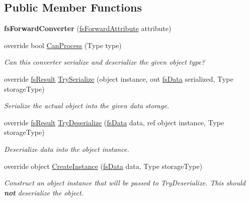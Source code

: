 \subsection*{Public Member Functions}
\begin{DoxyCompactItemize}
\item 
\mbox{\label{class_full_serializer_1_1_internal_1_1fs_forward_converter_a485561a31edc65a3f1c6972af8b677e3}} 
{\bfseries fs\+Forward\+Converter} (\hyperlink{class_full_serializer_1_1fs_forward_attribute}{fs\+Forward\+Attribute} attribute)
\item 
override bool \hyperlink{class_full_serializer_1_1_internal_1_1fs_forward_converter_a252f2f0a0391e2099be798b1749a2582}{Can\+Process} (Type type)
\begin{DoxyCompactList}\small\item\em Can this converter serialize and deserialize the given object type? \end{DoxyCompactList}\item 
override \hyperlink{struct_full_serializer_1_1fs_result}{fs\+Result} \hyperlink{class_full_serializer_1_1_internal_1_1fs_forward_converter_a71b51a115cf749f1a3232fb1498f2d6f}{Try\+Serialize} (object instance, out \hyperlink{class_full_serializer_1_1fs_data}{fs\+Data} serialized, Type storage\+Type)
\begin{DoxyCompactList}\small\item\em Serialize the actual object into the given data storage. \end{DoxyCompactList}\item 
override \hyperlink{struct_full_serializer_1_1fs_result}{fs\+Result} \hyperlink{class_full_serializer_1_1_internal_1_1fs_forward_converter_a81d2d460112d57d67e8156cd5a52e1e1}{Try\+Deserialize} (\hyperlink{class_full_serializer_1_1fs_data}{fs\+Data} data, ref object instance, Type storage\+Type)
\begin{DoxyCompactList}\small\item\em Deserialize data into the object instance. \end{DoxyCompactList}\item 
override object \hyperlink{class_full_serializer_1_1_internal_1_1fs_forward_converter_ac060a50ae6f3241ea0f9465e1d261d12}{Create\+Instance} (\hyperlink{class_full_serializer_1_1fs_data}{fs\+Data} data, Type storage\+Type)
\begin{DoxyCompactList}\small\item\em Construct an object instance that will be passed to Try\+Deserialize. This should {\bfseries not} deserialize the object. \end{DoxyCompactList}\end{DoxyCompactItemize}
